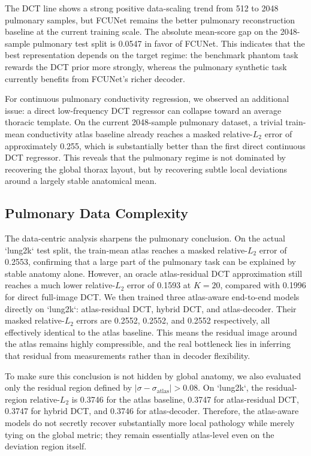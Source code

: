 \documentclass[11pt,a4paper]{article}
\begin{document}
The DCT line shows a strong positive data-scaling trend from 512 to 2048 pulmonary samples, but FCUNet remains the better pulmonary reconstruction baseline at the current training scale. The absolute mean-score gap on the 2048-sample pulmonary test split is 0.0547 in favor of FCUNet. This indicates that the best representation depends on the target regime: the benchmark phantom task rewards the DCT prior more strongly, whereas the pulmonary synthetic task currently benefits from FCUNet's richer decoder.

For continuous pulmonary conductivity regression, we observed an additional issue: a direct low-frequency DCT regressor can collapse toward an average thoracic template. On the current 2048-sample pulmonary dataset, a trivial train-mean conductivity atlas baseline already reaches a masked relative-$L_2$ error of approximately 0.255, which is substantially better than the first direct continuous DCT regressor. This reveals that the pulmonary regime is not dominated by recovering the global thorax layout, but by recovering subtle local deviations around a largely stable anatomical mean.

\subsection{Pulmonary Data Complexity}
The data-centric analysis sharpens the pulmonary conclusion. On the actual `lung2k` test split, the train-mean atlas reaches a masked relative-$L_2$ error of 0.2553, confirming that a large part of the pulmonary task can be explained by stable anatomy alone. However, an oracle atlas-residual DCT approximation still reaches a much lower relative-$L_2$ error of 0.1593 at $K=20$, compared with 0.1996 for direct full-image DCT. We then trained three atlas-aware end-to-end models directly on `lung2k`: atlas-residual DCT, hybrid DCT, and atlas-decoder. Their masked relative-$L_2$ errors are 0.2552, 0.2552, and 0.2552 respectively, all effectively identical to the atlas baseline. This means the residual image around the atlas remains highly compressible, and the real bottleneck lies in inferring that residual from measurements rather than in decoder flexibility.

To make sure this conclusion is not hidden by global anatomy, we also evaluated only the residual region defined by $|\sigma - \sigma_{\text{atlas}}| > 0.08$. On `lung2k`, the residual-region relative-$L_2$ is 0.3746 for the atlas baseline, 0.3747 for atlas-residual DCT, 0.3747 for hybrid DCT, and 0.3746 for atlas-decoder. Therefore, the atlas-aware models do not secretly recover substantially more local pathology while merely tying on the global metric; they remain essentially atlas-level even on the deviation region itself.
\end{document}
